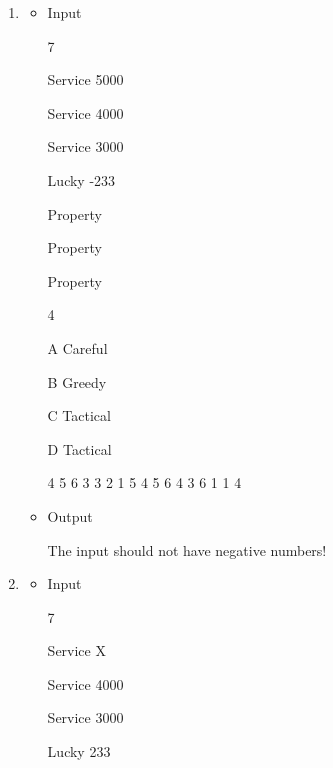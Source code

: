 \documentclass[a4paper, 12pt]{report}
\begin{document}
\begin{enumerate}
\begin{itemize}
-7

Property

Property

Property

Property

Property

Property

Property

4

A Careful

B Greedy

C Tactical

D Tactical

1 2 2 2 1 1 1 1 1 1 1 1 1 1 1 1 1 1 1 1 1 1 1 1 3 2 2 2 1 1 1 1 1 1 1 1 1 1 1 1 4 3 1 1 1

		\item Output
		
The input should not have negative numbers!

	\end{itemize}
\item
	\begin{itemize}
		\item Input

7

Service 5000

Service 4000

Service 3000

Lucky -233

Property

Property

Property

4

A Careful

B Greedy

C Tactical

D Tactical

4 5 6 3 3 2 1 5 4 5 6 4 3 6 1 1 4

		\item Output
		
The input should not have negative numbers!

	\end{itemize}
\item
	\begin{itemize}
		\item Input
		
7

Service X

Service 4000

Service 3000

Lucky 233


\end{itemize}
\end{enumerate}
\end{document}
